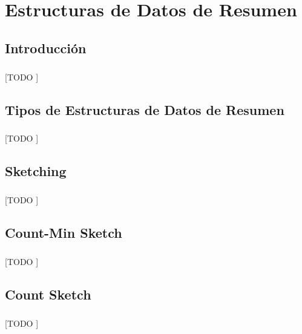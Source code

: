 \documentclass{subfiles}
\begin{document}
  \chapter{Estructuras de Datos de Resumen}
  \label{chapter:summaries}

    \section{Introducción}
    \label{sec:summaries_intro}

      \paragraph{}
      [TODO ]


    \section{Tipos de Estructuras de Datos de Resumen}
    \label{sec:summaries_types}

      \paragraph{}
      [TODO ]

    \section{Sketching}
    \label{sec:sketching}

      \paragraph{}
      [TODO ]

    \section{Count-Min Sketch}
    \label{sec:count_min_sketch}

      \paragraph{}
      [TODO ]

    \section{Count Sketch}
    \label{sec:count_sketch}

      \paragraph{}
      [TODO ]
\end{document}
